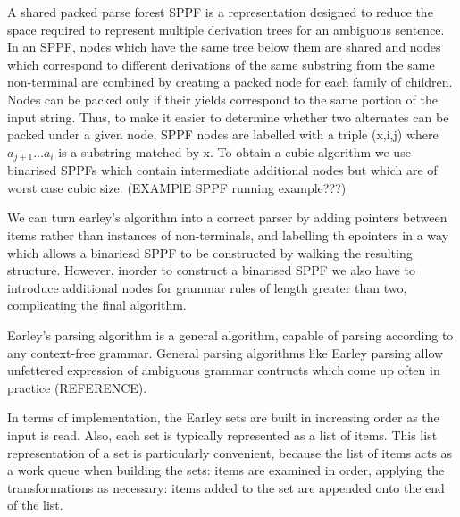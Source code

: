 \begin{isabellebody}
\begin{isamarkuptext}
A shared packed parse forest SPPF is a representation designed to reduce the space required to represent multiple derivation
trees for an ambiguous sentence. In an SPPF, nodes which have the same tree below them are shared and nodes which correspond
to different derivations of the same substring from the same non-terminal are combined by creating a packed node for each
family of children. Nodes can be packed only if their yields correspond to the same portion of the input string. Thus, to make it easier
to determine whether two alternates can be packed under a given node, SPPF nodes are labelled with a triple (x,i,j) where
$a_{j+1} \dots a_i$ is a substring matched by x. To obtain a cubic algorithm we use binarised SPPFs which contain intermediate additional
nodes but which are of worst case cubic size. (EXAMPlE SPPF running example???)

We can turn earley's algorithm into a correct parser by adding pointers between items rather than instances of non-terminals, and labelling th epointers
in a way which allows a binariesd SPPF to be constructed by walking the resulting structure. However, inorder to
construct a binarised SPPF we also have to introduce additional nodes for grammar rules of length greater than two,
complicating the final algorithm.%
\end{isamarkuptext}\isamarkuptrue%
%
\isadelimdocument
%
\endisadelimdocument
%
\isatagdocument
%
\isamarkuptrue%
%
\endisatagdocument
{\isafolddocument}%
%
\isadelimdocument
%
\endisadelimdocument
%
\begin{isamarkuptext}%
Earley's parsing algorithm is a general algorithm, capable of parsing according to any context-free
grammar. General parsing algorithms like Earley parsing allow unfettered expression of ambiguous grammar
contructs which come up often in practice (REFERENCE).

In terms of implementation, the Earley sets are built in increasing order as the input is read. Also,
each set is typically represented as a list of items. This list representation of a set is particularly
convenient, because the list of items acts as a work queue when building the sets: items are examined
in order, applying the transformations as necessary: items added to the set are appended onto the end of
the list.


\end{isamarkuptext}
\end{isabellebody}

